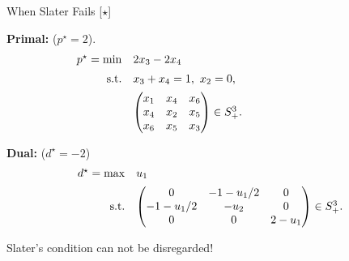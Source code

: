 \documentclass[9pt]{beamer}
\begin{document}
\begin{frame}{When Slater Fails [$\star$]}

  \textbf{Primal:} ($p^\star = 2$).
  \[
    \begin{array}{rl}
      p^\star = \min & 2 x_3 - 2 x_4\\[0.5em]
      \mathrm{s.t.} & x_3 + x_4 = 1, ~x_2 = 0,\\[0.5em]
           &
             \begin{pmatrix}
               x_1 & x_4 & x_6\\
               x_4 & x_2 & x_5\\
               x_6 & x_5 & x_3
             \end{pmatrix}
                           \in S^3_+.\hspace{9em}
    \end{array}
  \]

  \vfill

  \textbf{Dual:} ($d^\star=-2$)
  \[
    \begin{array}{rl}
      d^\star = \max & u_1\\[0.5em]
      \mathrm{s.t.} &
                       \begin{pmatrix}
                         0 & -1-u_1/2 & 0\\
                         -1-u_1/2 & -u_2 & 0\\
                         0 & 0 & 2-u_1
                       \end{pmatrix}
                                     \in S^3_+.
    \end{array}
  \]

  \vfill

  Slater's condition can not be disregarded!
  
\end{frame}



\end{document}

